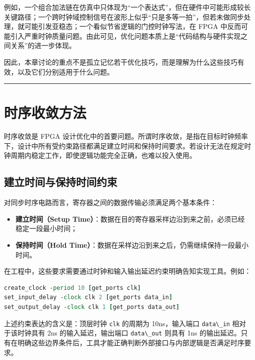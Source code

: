 例如，一个组合加法链在仿真中只体现为``一个表达式''，但在硬件中可能形成较长关键路径；一个跨时钟域控制信号在波形上似乎``只是多等一拍''，但若未做同步处理，就可能引发亚稳态；一个看似节省逻辑的门控时钟写法，在
FPGA
中反而可能引入严重时钟质量问题。由此可见，优化问题本质上是``代码结构与硬件实现之间关系''的进一步体现。

因此，本章讨论的重点不是孤立记忆若干优化技巧，而是理解为什么这些技巧有效，以及它们分别适用于什么问题。

\begin{center}\rule{0.5\linewidth}{0.5pt}\end{center}

\section{时序收敛方法}\label{ux65f6ux5e8fux6536ux655bux65b9ux6cd5}

时序收敛是 FPGA
设计优化中的首要问题。所谓时序收敛，是指在目标时钟频率下，设计中所有受约束路径都满足建立时间和保持时间要求。若设计无法在规定时钟周期内稳定工作，即使逻辑功能完全正确，也难以投入使用。

\subsection{建立时间与保持时间约束}\label{ux5efaux7acbux65f6ux95f4ux4e0eux4fddux6301ux65f6ux95f4ux7ea6ux675f}

对同步时序电路而言，寄存器之间的数据传输必须满足两个基本条件：

\begin{itemize}
\tightlist
\item
  \textbf{建立时间（Setup
  Time）}：数据在目的寄存器采样边沿到来之前，必须已经稳定一段最小时间；
\item
  \textbf{保持时间（Hold
  Time）}：数据在采样边沿到来之后，仍需继续保持一段最小时间。
\end{itemize}

在工程中，这些要求需要通过时钟和输入输出延迟约束明确告知实现工具。例如：

\begin{lstlisting}[language=tcl]
create_clock -period 10 [get_ports clk]
set_input_delay -clock clk 2 [get_ports data_in]
set_output_delay -clock clk 1 [get_ports data_out]
\end{lstlisting}

上述约束表达的含义是：顶层时钟 \passthrough{\lstinline!clk!} 的周期为
10ns，输入端口 \passthrough{\lstinline!data\_in!} 相对于该时钟具有 2ns
的输入延迟，输出端口 \passthrough{\lstinline!data\_out!} 则具有 1ns
的输出延迟。只有在明确这些边界条件后，工具才能正确判断外部接口与内部逻辑是否满足时序要求。

